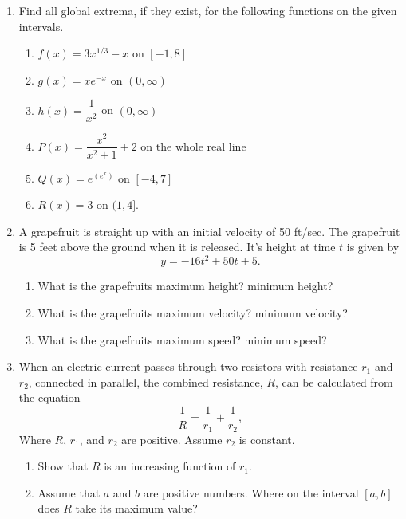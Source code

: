 \documentclass[11pt]{article}
\begin{document}
\drawtitle
\begin{enumerate}
\item Find all global extrema, if they exist, for the following
  functions on the given intervals.
  \begin{enumerate}
  \item $f(x)=3x^{1/3}-x$ on $[-1,8]$
  
    \vfill
  
  \item $g(x)=xe^{-x}$ on $(0,\infty)$

    \vfill
    
    \newpage

  \item $h(x)=\dfrac{1}{x^2}$ on $(0,\infty)$
    \vfill

  \item $P(x)=\dfrac{x^2}{x^2+1}+2$ on the whole real line
    \vfill 
    \newpage

  \item $\displaystyle Q(x)=e^{\left(e^x\right)}$ on $[-4,7]$
    \vfill

  \item $R(x)=3$ on $(1,4]$.
    \vfill 
  \end{enumerate}

\newpage


\item A grapefruit is straight up with an initial velocity of 50
  ft/sec.  The grapefruit is 5 feet above the ground when it is
  released.  It's height at time $t$ is given by
  \[
  y=-16t^2+50t+5.
  \]
  \begin{enumerate}
  \item What is the grapefruits maximum height? minimum height?
    
    \vfill
    
  \item What is the grapefruits maximum velocity? minimum velocity?
    
    \vfill
    
  \item What is the grapefruits maximum speed? minimum speed?
    
    \vfill
    
  \end{enumerate}

  \newpage
  
\item When an electric current passes through two resistors with
  resistance $r_1$ and $r_2$, connected in parallel, the combined
  resistance, $R$, can be calculated from the equation
  \[
  \frac{1}{R}=\frac{1}{r_1}+\frac{1}{r_2},
  \]
  Where $R$, $r_1$, and $r_2$ are positive.  Assume $r_2$ is constant.
  \begin{enumerate}
  \item Show that $R$ is an increasing function of $r_1$.
    \vfill
  \item Assume that $a$ and $b$ are positive numbers.  Where on the interval
    $[a,b]$ does $R$ take its maximum value?
    \vfill
  \end{enumerate}


\end{enumerate}
\end{document}
